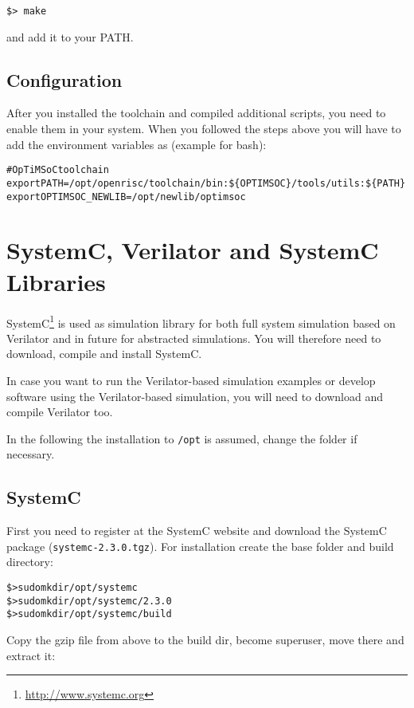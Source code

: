 \begin{verbatim}
$> make
\end{verbatim}

and add it to your PATH.

\subsection{Configuration}

After you installed the toolchain and compiled additional scripts, you
need to enable them in your system. When you followed the steps above
you will have to add the environment variables as (example for bash):

\begin{alltt}
# OpTiMSoC toolchain
export PATH=/opt/openrisc/toolchain/bin:\$\{OPTIMSOC\}/tools/utils:\$\{PATH\}
export OPTIMSOC_NEWLIB=/opt/newlib/optimsoc
\end{alltt}

\section{SystemC, Verilator and SystemC Libraries}

SystemC\footnote{\url{http://www.systemc.org}} is used as simulation
library for both full system simulation based on Verilator and in
future for abstracted simulations. You will therefore need to
download, compile and install SystemC.

In case you want to run the Verilator-based simulation examples or
develop software using the Verilator-based simulation, you will need
to download and compile Verilator too.

In the following the installation to \verb|/opt| is assumed, change
the folder if necessary.

\subsection{SystemC}

First you need to register at the SystemC website and download the
SystemC package (\verb|systemc-2.3.0.tgz|). For installation create
the base folder and build directory:

\begin{alltt}
\$> sudo mkdir /opt/systemc
\$> sudo mkdir /opt/systemc/2.3.0
\$> sudo mkdir /opt/systemc/build
\end{alltt}

Copy the gzip file from above to the build dir, become superuser, move
there and extract it:

